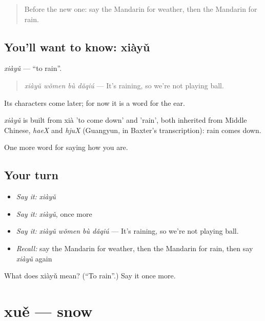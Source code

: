 \begin{quote}
Before the new one: say the Mandarin for weather, then the Mandarin for rain.
\end{quote}

\subsection*{You'll want to know: xiàyǔ}
\emph{xiàyǔ} — \textquotedblleft{}to rain\textquotedblright{}.

\begin{quote}
\emph{xiàyǔ wǒmen bù dǎqiú} — It's raining, so we're not playing ball.
\end{quote}

Its characters come later; for now it is a word for the ear.

\begin{cousinweb}
\emph{xiàyǔ} is built from xià 'to come down' and  'rain', both inherited from Middle Chinese, \emph{haeX} and \emph{hjuX} (Guangyun, in Baxter's transcription): rain comes down.
\end{cousinweb}

\begin{grammarlens}[title={What you've built}]
One more word for saying how you are.
\end{grammarlens}

\subsection*{Your turn}
\begin{itemize}
\raggedright
  \item \emph{Say it:} \emph{xiàyǔ}
  \item \emph{Say it:} \emph{xiàyǔ}, once more
  \item \emph{Say it:} \emph{xiàyǔ wǒmen bù dǎqiú} — It's raining, so we're not playing ball.
  \item \emph{Recall:} say the Mandarin for weather, then the Mandarin for rain, then say \emph{xiàyǔ} again
\end{itemize}

\begin{tcolorbox}[breakable,colback=teal!4,colframe=teal!35!black,title={Before you move on}]
What does xiàyǔ mean? (\textquotedblleft{}To rain\textquotedblright{}.) Say it once more.
\end{tcolorbox}
\section[xuě]{xuě — snow}

